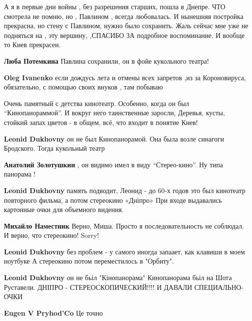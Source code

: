 \begin{itemize}
А я в первые дни войны , без разрешения старших, пошла в Днепре. ЧТО смотрела
не помню, но , Павлином , всегда любовалась. И нынешняя постройка прекрасна, но
стену с Павлином, нужно было сохранить. Жаль сейчас мне уже не подняться на ,
эту вершину, ,СПАСИБО ЗА подробное воспоминание. И вообще то Киев прекрасен.

\begin{itemize} %
\textbf{Люба Потемкина} Павлина сохранили, он в фойе кукольного театра!

\textbf{Oleg Ivanenko} если дождусь лета и отмены всех запретов ,из за Короновируса, обязательно, с помощью своих внуков , там побываю
\end{itemize} %


Очень памятный с детства кинотеатр. Особенно, когда он был \enquote{Кинопанораммой}. И
вокруг него таинственные заросли, Деревья, кусты, стойкий запах цветов - в
общем, всё, что входит в понятие Киев!

\begin{itemize} %
\textbf{Leonid Dukhovny} он не был Кинопанорамой. Она была возле синагоги Бродского. Тогда кукольный театр

\textbf{Анатолий Золотушкин} , он видимо имел в виду \enquote{Стерео-кино}. Ну типа панорама !

\textbf{Leonid Dukhovny} память подводит, Леонид - до 60-х годов это был кинотеатр повторного фильма, а потом стереокино «Дніпро» При входе выдавались картонные очки для объемного видения.

\begin{itemize} %
\textbf{Михайло Наместник} Верно, Миша. Просто я последовательность не соблюдал. И верно, что стереокино! Sorry!

\textbf{Leonid Dukhovny} без проблем - у самого иногда запаает, как клавиши в моем ноутбуке А стереокино потом переместилось в "Орбиту".
\end{itemize} %

\textbf{Leonid Dukhovny} он не бьіл "Кінопанорама"
Кинопанорама бьіл на Шота Руставели.
ДНІПРО - СТЕРЕОСКОПИЧЕСКИЙ!!!!
И ДАВАЛИ СПЕЦИАЛЬНО-ОЧКИ

\begin{itemize} %
\textbf{Eugen V Pryhod'Co} Це точно


\end{itemize}
\end{itemize}
\end{itemize}
